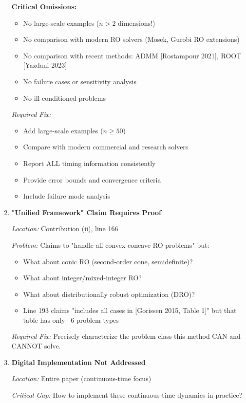 \documentclass[journal,twoside,web]{ieeecolor}
\begin{document}
\begin{enumerate}[resume]
\textbf{Critical Omissions:}
\begin{itemize}
\item No large-scale examples ($n > 2$ dimensions!)
\item No comparison with modern RO solvers (Mosek, Gurobi RO extensions)
\item No comparison with recent methods: ADMM [Rostampour 2021], ROOT [Yazdani 2023]
\item No failure cases or sensitivity analysis
\item No ill-conditioned problems
\end{itemize}

\textit{Required Fix:}
\begin{itemize}
\item Add large-scale examples ($n \geq 50$)
\item Compare with modern commercial and research solvers
\item Report ALL timing information consistently
\item Provide error bounds and convergence criteria
\item Include failure mode analysis
\end{itemize}

\item \textbf{"Unified Framework" Claim Requires Proof}

\textit{Location:} Contribution (ii), line 166

\textit{Problem:} Claims to "handle all convex-concave RO problems" but:

\begin{itemize}
\item What about conic RO (second-order cone, semidefinite)?
\item What about integer/mixed-integer RO?
\item What about distributionally robust optimization (DRO)?
\item Line 193 claims "includes all cases in [Gorissen 2015, Table 1]" but that table has only ~6 problem types
\end{itemize}

\textit{Required Fix:} Precisely characterize the problem class this method CAN and CANNOT solve.

\item \textbf{Digital Implementation Not Addressed}

\textit{Location:} Entire paper (continuous-time focus)

\textit{Critical Gap:} How to implement these continuous-time dynamics in practice?


\end{enumerate}
\end{document}
